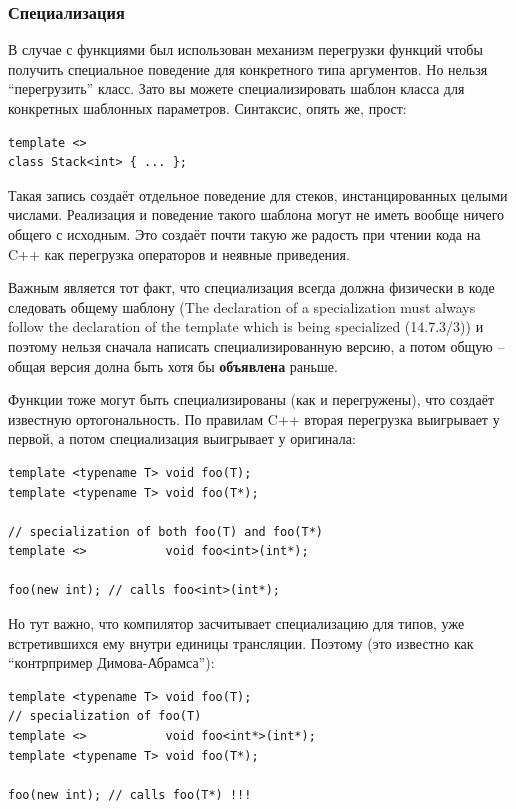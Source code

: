 \documentclass[a4paper,12pt,oneside]{article}
\begin{document}
\subsubsection{Специализация}\label{TemplateSpec}

В случае с функциями был использован механизм перегрузки функций чтобы получить специальное поведение для конкретного типа аргументов. Но нельзя ``перегрузить'' класс. Зато вы можете специализировать шаблон класса для конкретных шаблонных параметров. Синтаксис, опять же, прост:

\begin{lstlisting}
template <>
class Stack<int> { ... };
\end{lstlisting}

Такая запись создаёт отдельное поведение для стеков, инстанцированных целыми числами. Реализация и поведение такого шаблона могут не иметь вообще ничего общего с исходным. Это создаёт почти такую же радость при чтении кода на C++ как перегрузка операторов и неявные приведения.

Важным является тот факт, что специализация всегда должна физически в коде следовать общему шаблону (The declaration of a specialization must always follow the declaration of the template which is being specialized (14.7.3/3)) и поэтому нельзя сначала написать специализированную версию, а потом общую -- общая версия долна быть хотя бы \textbf{объявлена} раньше.

Функции тоже могут быть специализированы (как и перегружены), что создаёт известную ортогональность. По правилам C++ вторая перегрузка выигрывает у первой, а потом специализация выигрывает у оригинала:

\begin{lstlisting}
template <typename T> void foo(T);
template <typename T> void foo(T*); 

// specialization of both foo(T) and foo(T*)
template <>           void foo<int>(int*); 

foo(new int); // calls foo<int>(int*);
\end{lstlisting}

Но тут важно, что компилятор засчитывает специализацию для типов, уже встретившихся ему внутри единицы трансляции. Поэтому (это известно как ``контрпример Димова-Абрамса''):

\begin{lstlisting}
template <typename T> void foo(T);
// specialization of foo(T)
template <>           void foo<int*>(int*); 
template <typename T> void foo(T*);

foo(new int); // calls foo(T*) !!!
\end{lstlisting}
\end{document}
